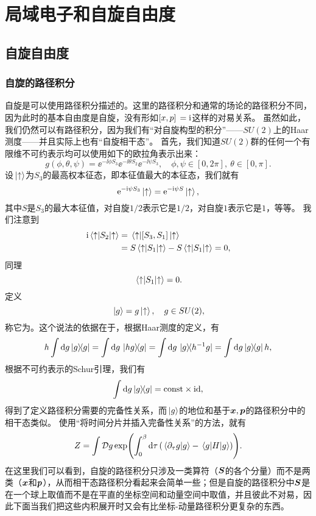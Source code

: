 \chapter{局域电子和自旋自由度}

\section{自旋自由度}

\subsection{自旋的路径积分}

自旋是可以使用路径积分描述的。这里的路径积分和通常的场论的路径积分不同，因为此时的基本自由度是自旋，没有形如$\comm*{x}{p} = \ii$这样的对易关系。
虽然如此，我们仍然可以有路径积分，因为我们有“对自旋构型的积分”——$SU(2)$上的Haar测度——并且实际上也有“自旋相干态”。
首先，我们知道$SU(2)$群的任何一个有限维不可约表示均可以使用如下的欧拉角表示出来：
\begin{equation}
    g(\phi, \theta, \psi) = \ee^{- \ii \phi S_3} \ee^{- \ii \theta S_2} \ee^{- \ii \psi S_3}, \quad \phi, \psi \in [0, 2\pi], \ \theta \in [0, \pi].
\end{equation}
设$\ket*{\uparrow}$为$S_3$的最高权本征态，即本征值最大的本征态，我们就有
\begin{equation}
    \mathrm{e}^{- \mathrm{i} \psi S_3} \ket*{\uparrow} = \mathrm{e}^{- \mathrm{i} \psi S} \ket*{\uparrow},
\end{equation}
其中$S$是$S_3$的最大本征值，对自旋$1/2$表示它是$1/2$，对自旋$1$表示它是$1$，等等。
我们注意到
\[
    \begin{aligned}
        \ii \mel*{\uparrow}{S_2}{\uparrow} &= \mel*{\uparrow}{\comm*{S_3}{S_1}}{\uparrow} \\
        &= S \mel*{\uparrow}{S_1}{\uparrow} - S \mel*{\uparrow}{S_1}{\uparrow} = 0,
    \end{aligned}
\]
同理
\[
    \mel*{\uparrow}{S_1}{\uparrow} = 0.
\]
定义
\begin{equation}
    \ket*{g} = g \ket*{\uparrow}, \quad g \in SU(2),
\end{equation}
称它为。这个说法的依据在于，根据Haar测度的定义，有
\[
    h \int \dd{g} \dyad{g} = \int \dd{g} \dyad*{hg}{g} = \int \dd{g} \dyad*{g}{h^{-1} g} = \int \dd{g} \dyad{g} h, 
\]
根据不可约表示的Schur引理，我们有
\begin{equation}
    \int \dd{g} \dyad{g} = \const \times \mathrm{id}, 
\end{equation}
得到了定义路径积分需要的完备性关系，而$\ket*{g}$的地位和基于$\vb*{x}, \vb*{p}$的路径积分中的相干态类似。
使用“将时间分片并插入完备性关系”的方法，就有
\begin{equation}
    Z = \int \mathcal{D} g \exp(\int_0^\beta \dd{\tau} (\braket*{\partial_\tau g}{g} - \mel*{g}{H}{g})).
    \label{eq:spin-partition-original}
\end{equation}
在这里我们可以看到，自旋的路径积分只涉及一类算符（$\vb*{S}$的各个分量）而不是两类（$\vb*{x}$和$\vb*{p}$），从而相干态路径积分看起来会简单一些；但是自旋的路径积分中$\vb*{S}$是在一个球上取值而不是在平直的坐标空间和动量空间中取值，并且彼此不对易，因此下面当我们把这些内积展开时又会有比坐标-动量路径积分更复杂的东西。

